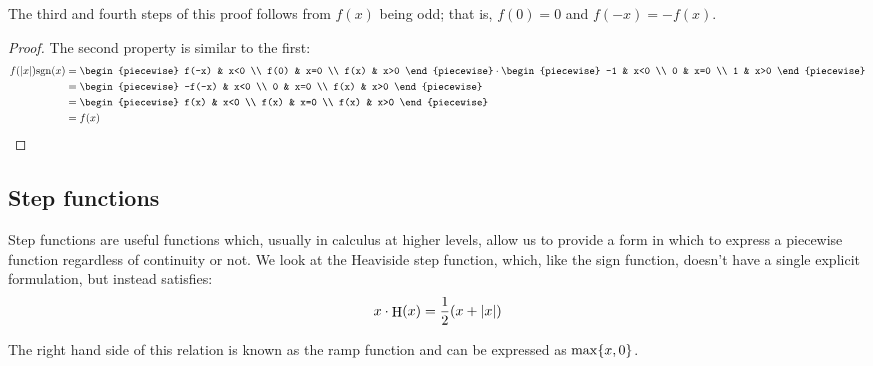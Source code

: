 \begin{theorem}
    The third and fourth steps of this proof follows from $f(x)$ being odd; that is, $f(0)=0$ and $f(-x)=-f(x)$.

    \begin{proof}
        The second property is similar to the first:
        \begin{align*}
            f(\abs{x})\sgn{x} &=\begin{piecewise}
                f(-x) & x<0 \\
                f(0) & x=0 \\
                f(x) & x>0
            \end{piecewise}\cdot\begin{piecewise}
                -1 & x<0 \\
                0 & x=0 \\
                1 & x>0
            \end{piecewise} \\
            &= \begin{piecewise}
                -f(-x) & x<0 \\
                0 & x=0 \\
                f(x) & x>0
            \end{piecewise} \\
            &= \begin{piecewise}
                f(x) & x<0 \\
                f(x) & x=0 \\
                f(x) & x>0
            \end{piecewise} \\
            &= f(x)
        \end{align*}
    \end{proof}
\end{theorem}

\subsection{Step functions}
Step functions are useful functions which, usually in calculus at higher levels, allow us to provide a form in which to express a piecewise function regardless of continuity or not. We look at the Heaviside step function, which, like the sign function, doesn't have a single explicit formulation, but instead satisfies:
$$
    x\cdot\step{x}=\frac{1}{2}\paren*{x+\abs{x}}
$$

The right hand side of this relation is known as the ramp function and can be expressed as $\max\{x,0\}$.

